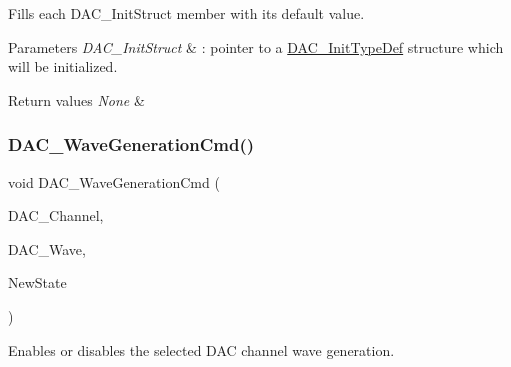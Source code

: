Fills each D\+A\+C\+\_\+\+Init\+Struct member with its default value. 


\begin{DoxyParams}{Parameters}
{\em D\+A\+C\+\_\+\+Init\+Struct} & \+: pointer to a \mbox{\hyperlink{struct_d_a_c___init_type_def}{D\+A\+C\+\_\+\+Init\+Type\+Def}} structure which will be initialized. \\
\hline
\end{DoxyParams}

\begin{DoxyRetVals}{Return values}
{\em None} & \\
\hline
\end{DoxyRetVals}
\mbox{\label{group___d_a_c___exported___functions_gabd51ae6880821d4dcd923969ec19a19e}} 
\subsubsection{\texorpdfstring{DAC\_WaveGenerationCmd()}{DAC\_WaveGenerationCmd()}}
{\footnotesize\ttfamily void D\+A\+C\+\_\+\+Wave\+Generation\+Cmd (\begin{DoxyParamCaption}\item[{uint32\+\_\+t}]{D\+A\+C\+\_\+\+Channel,  }\item[{uint32\+\_\+t}]{D\+A\+C\+\_\+\+Wave,  }\item[{\mbox{\hyperlink{group___exported__types_gac9a7e9a35d2513ec15c3b537aaa4fba1}{Functional\+State}}}]{New\+State }\end{DoxyParamCaption})}



Enables or disables the selected D\+AC channel wave generation. 


